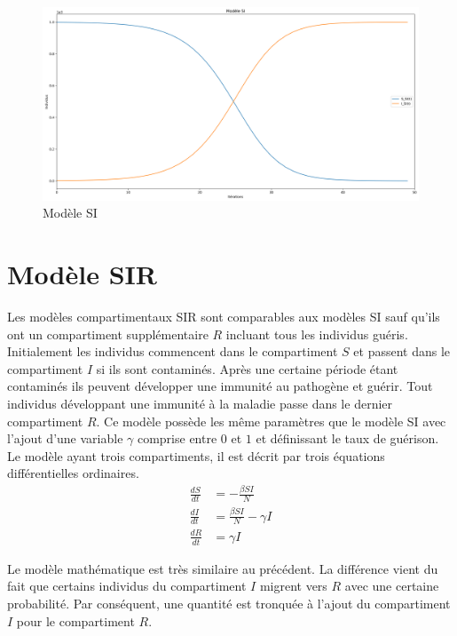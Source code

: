 \begin{figure}[h]
\centering
\captionsetup{justification=centering}
\includegraphics[scale=0.3]{Images/SI_exemple.png}
\caption{Modèle SI}
\end{figure}

\section{Modèle SIR}

Les modèles compartimentaux SIR sont comparables aux modèles SI sauf qu'ils ont un compartiment supplémentaire $R$ incluant tous les individus guéris. Initialement les individus commencent dans le compartiment $S$ et passent dans le compartiment $I$ si ils sont contaminés. Après une certaine période étant contaminés ils peuvent développer une immunité au pathogène et guérir. Tout individus développant une immunité à la maladie passe dans le dernier compartiment $R$. Ce modèle possède les même paramètres que le modèle SI avec l'ajout d'une variable $\gamma$ comprise entre $0$ et $1$ et définissant le taux de guérison.\\

Le modèle ayant trois compartiments, il est décrit par trois équations différentielles ordinaires.
\begin{align}
    \frac{dS}{dt} &= -\frac{\beta S I}{N}\\
    \frac{dI}{dt} &= \frac{\beta S I}{N} - \gamma I\\
    \frac{dR}{dt} &= \gamma I
\end{align}

Le modèle mathématique est très similaire au précédent. La différence vient du fait que certains individus du compartiment $I$ migrent vers $R$ avec une certaine probabilité. Par conséquent, une quantité est tronquée à l'ajout du compartiment $I$ pour le compartiment $R$.\\

